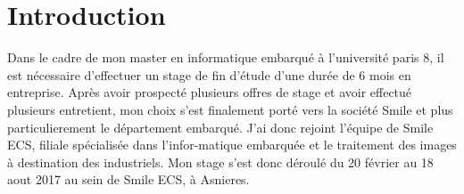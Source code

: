 \chapter*{Introduction}

Dans le cadre de mon master en informatique embarqué à l'université paris 8, il est
nécessaire d’effectuer un stage de fin d’étude d’une durée de 6 mois en entreprise.
Après avoir prospecté plusieurs offres de stage et avoir effectué plusieurs entretient,
mon choix s’est finalement porté vers la société Smile et plus particulierement le département
embarqué.
J’ai donc rejoint l'équipe de Smile ECS, filiale spécialisée dans l’infor-matique
embarquée et le traitement des images à destination des industriels.
Mon stage s’est donc déroulé du 20 février au 18 aout 2017 au sein de Smile ECS,
à Asnieres.
